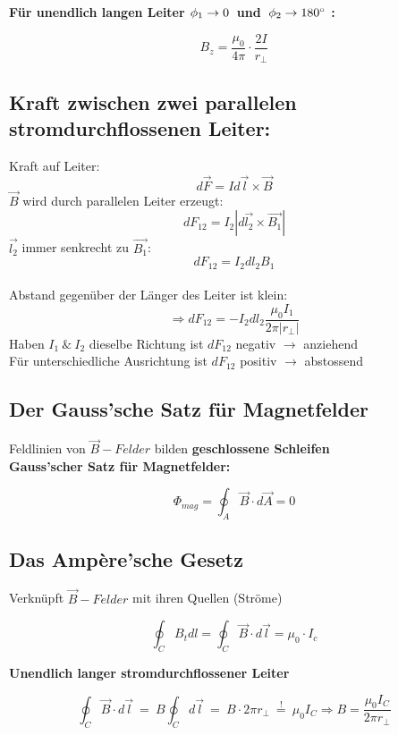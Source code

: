 \textbf{Für unendlich langen Leiter $\phi_1 \rightarrow 0 \hspace{2mm}$und$\hspace{2mm} \phi_2 \rightarrow 180^\circ$ :}
\begin{formulabox}
    \[
        B_z = \frac{\mu_0}{4 \pi} \cdot \frac{2 I}{r_{\perp}}
    \]
\end{formulabox}

\subsection{Kraft zwischen zwei parallelen stromdurchflossenen Leiter:}
Kraft auf Leiter:
\[
    d\Vec{F} = Id\vec{l} \times \vec{B}
\]
$\vec{B}$ wird durch parallelen Leiter erzeugt:
\[
    dF_{12} = I_2 |d\vec{l_2} \times \vec{B_1}|
\]
$\vec{l_2}$ immer senkrecht zu $\vec{B_1}$:
\[
    dF_{12} = I_2 dl_2 B_1
\]
\\[1ex]
Abstand gegenüber der Länger des Leiter ist klein:
\[
    \Rightarrow dF_{12} = - I_2 dl_2 \frac{\mu_0 I_1}{2 \pi |r_{\perp}|}
\]
\hspace{5mm} Haben $I_1  \ \& \ I_2$ dieselbe Richtung ist $dF_{12}$ negativ $\rightarrow$ anziehend \\
\hspace{5mm} Für unterschiedliche Ausrichtung ist $dF_{12}$ positiv $\rightarrow$ abstossend

\subsection{Der Gauss'sche Satz für Magnetfelder}
Feldlinien von $\vec{B}-Felder$ bilden \textbf{geschlossene Schleifen} \\[1ex]
\textbf{Gauss'scher Satz für Magnetfelder:}
\begin{formulabox}
    \[
        \Phi_{mag} = \oint_A \vec{B} \cdot d\vec{A} = 0  
    \]
\end{formulabox}

\subsection{Das Ampère'sche Gesetz}
Verknüpft $\vec{B}-Felder$ mit ihren Quellen (Ströme)
\begin{formulabox}
    \[
        \oint_C B_t dl = \oint_C \vec{B} \cdot d\vec{l} = \mu_0 \cdot I_c
    \]
\end{formulabox}

\textbf{Unendlich langer stromdurchflossener Leiter}
\begin{formulabox}
    \[
        \oint_C \vec{B} \cdot d\vec{l} \ = \ B \oint_C d\vec{l} \ = \ B \cdot 2\pi r_{\perp} \ \stackrel{!}{=} \ \mu_0 I_C \Rightarrow B = \frac{\mu_0 I_C}{2\pi r_{\perp}}
    \]
\end{formulabox}

